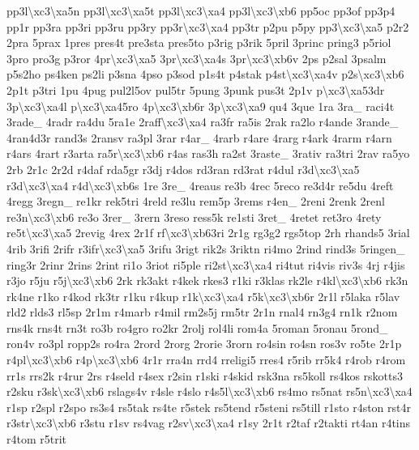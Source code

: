 \begin{DoxyCompactItemize}
pp3l\textbackslash{}xc3\textbackslash{}xa5n pp3l\textbackslash{}xc3\textbackslash{}xa5t pp3l\textbackslash{}xc3\textbackslash{}xa4 pp3l\textbackslash{}xc3\textbackslash{}xb6 pp5oc pp3of pp3p4 pp1r pp3ra pp3ri pp3ru pp3ry pp3r\textbackslash{}xc3\textbackslash{}xa4 pp3tr p2pu p5py pp3\textbackslash{}xc3\textbackslash{}xa5 p2r2 2pra 5prax 1pres pres4t pre3sta pres5to p3rig p3rik 5pril 3princ pring3 p5riol 3pro pro3g p3ror 4pr\textbackslash{}xc3\textbackslash{}xa5 3pr\textbackslash{}xc3\textbackslash{}xa4s 3pr\textbackslash{}xc3\textbackslash{}xb6v 2ps p2sal 3psalm p5s2ho ps4ken ps2li p3sna 4pso p3sod p1s4t p4stak p4st\textbackslash{}xc3\textbackslash{}xa4v p2s\textbackslash{}xc3\textbackslash{}xb6 2p1t p3tri 1pu 4pug pul2l5ov pul5tr 5pung 3punk pus3t 2p1v p\textbackslash{}xc3\textbackslash{}xa53dr 3p\textbackslash{}xc3\textbackslash{}xa4l p\textbackslash{}xc3\textbackslash{}xa45ro 4p\textbackslash{}xc3\textbackslash{}xb6r 3p\textbackslash{}xc3\textbackslash{}xa9 qu4 3que 1ra 3ra\-\_\- raci4t 3rade\-\_\- 4radr ra4du 5ra1e 2raff\textbackslash{}xc3\textbackslash{}xa4 ra3fr ra5is 2rak ra2lo r4ande 3rande\-\_\- 4ran4d3r rand3s 2ransv ra3pl 3rar r4ar\-\_\- 4rarb r4are 4rarg r4ark 4rarm r4arn r4ars 4rart r3arta ra5r\textbackslash{}xc3\textbackslash{}xb6 r4as ras3h ra2st 3raste\-\_\- 3rativ ra3tri 2rav ra5yo 2rb 2r1c 2r2d r4daf rda5gr r3dj r4dos rd3ran rd3rat r4dul r3d\textbackslash{}xc3\textbackslash{}xa5 r3d\textbackslash{}xc3\textbackslash{}xa4 r4d\textbackslash{}xc3\textbackslash{}xb6s 1re 3re\-\_\- 4reaus re3b 4rec 5reco re3d4r re5du 4reft 4regg 3regn\-\_\- re1kr rek5tri 4reld re3lu rem5p 3rems r4en\-\_\- 2reni 2renk 2renl re3n\textbackslash{}xc3\textbackslash{}xb6 re3o 3rer\-\_\- 3rern 3reso ress5k re1sti 3ret\-\_\- 4retet ret3ro 4rety re5t\textbackslash{}xc3\textbackslash{}xa5 2revig 4rex 2r1f rf\textbackslash{}xc3\textbackslash{}xb63ri 2r1g rg3g2 rgs5top 2rh rhands5 3rial 4rib 3rifi 2rifr r3ifr\textbackslash{}xc3\textbackslash{}xa5 3rifu 3rigt rik2s 3riktn ri4mo 2rind rind3s 5ringen\-\_\- ring3r 2rinr 2rins 2rint ri1o 3riot ri5ple ri2st\textbackslash{}xc3\textbackslash{}xa4 ri4tut ri4vis riv3s 4rj r4jis r3jo r5ju r5j\textbackslash{}xc3\textbackslash{}xb6 2rk rk3akt r4kek rkes3 r1ki r3klas rk2le r4kl\textbackslash{}xc3\textbackslash{}xb6 rk3n rk4ne r1ko r4kod rk3tr r1ku r4kup r1k\textbackslash{}xc3\textbackslash{}xa4 r5k\textbackslash{}xc3\textbackslash{}xb6r 2r1l r5laka r5lav rld2 rlds3 rl5sp 2r1m r4marb r4mil rm2s5j rm5tr 2r1n rnal4 rn3g4 rn1k r2nom rns4k rns4t rn3t ro3b ro4gro ro2kr 2rolj rol4li rom4a 5roman 5ronau 5rond\-\_\- ron4v ro3pl ropp2s ro4ra 2rord 2rorg 2rorie 3rorn ro4sin ro4sn ros3v ro5te 2r1p r4pl\textbackslash{}xc3\textbackslash{}xb6 r4p\textbackslash{}xc3\textbackslash{}xb6 4r1r rra4n rrd4 rreligi5 rres4 r5rib rr5k4 r4rob r4rom rr1s rrs2k r4rur 2rs r4seld r4sex r2sin r1ski r4skid rsk3na rs5koll rs4kos rskotts3 r2sku r3sk\textbackslash{}xc3\textbackslash{}xb6 rslags4v r4sle r4slo r4s5l\textbackslash{}xc3\textbackslash{}xb6 rs4mo rs5nat rs5n\textbackslash{}xc3\textbackslash{}xa4 r1sp r2spl r2spo rs3s4 rs5tak rs4te r5stek rs5tend r5steni rs5till r1sto r4ston rst4r r3str\textbackslash{}xc3\textbackslash{}xb6 r3stu r1sv rs4vag r2sv\textbackslash{}xc3\textbackslash{}xa4 r1sy 2r1t r2taf r2takti rt4an r4tins r4tom r5trit 
\end{DoxyCompactItemize}
